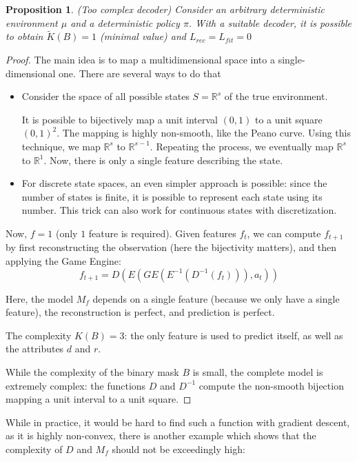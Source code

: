 \documentclass[a4paper,11pt,oneside]{report}
\newtheorem{proposition}{Proposition}[section]
\begin{document}
\begin{proposition}{(Too complex decoder)}
    Consider an arbitrary deterministic environment $\mu$ and a deterministic policy $\pi$. With a suitable decoder, it is possible to obtain $\tilde{K}(B)=1$ (minimal value) and $L_{rec}=L_{fit}=0$
\end{proposition}
\begin{proof}
    The main idea is to map a multidimensional space into a single-dimensional one. There are several ways to do that

    \begin{itemize}
    \item Consider the space of all possible states $S=\mathbb R^s$ of the true environment.

    It is possible to bijectively map a unit interval $(0,1)$ to a unit square $(0,1)^2$. The mapping is highly non-smooth, like the Peano curve.
    Using this technique, we map $\mathbb R^s$ to $\mathbb R^{s-1}$. Repeating the process, we eventually map $\mathbb R^s$ to $\mathbb R^1$. Now, there is only a single feature describing the state.

    \item For discrete state spaces, an even simpler approach is possible: since the number of states is finite, it is possible to represent each state using its number. This trick can also work for continuous states with discretization.
    \end{itemize}

    Now, $f=1$ (only $1$ feature is required). Given features $f_t$, we can compute $f_{t+1}$ by first reconstructing the observation (here the bijectivity matters), and then applying the Game Engine:
    $$
    f_{t+1}=D(E(GE(E^{-1}(D^{-1}(f_t))),a_t))
    $$

    Here, the model $M_f$ depends on a single feature (because we only have a single feature), the reconstruction is perfect, and prediction is perfect.

    The complexity $K(B)=3$: the only feature is used to predict itself, as well as the attributes $d$ and $r$.

    While the complexity of the binary mask $B$ is small, the complete model is extremely complex: the functions $D$ and $D^{-1}$ compute the non-smooth bijection mapping a unit interval to a unit square.
\end{proof}

While in practice, it would be hard to find such a function with gradient descent, as it is highly non-convex, there is another example which shows that the complexity of $D$ and $M_f$ should not be exceedingly high:
\end{document}
